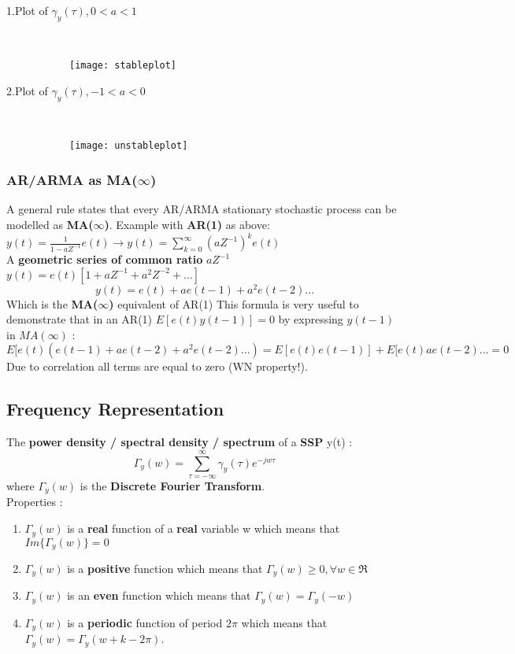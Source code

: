 \newpage
\begin{description}
\item[1.Plot of $\gamma_y(\tau) , 0<a<1$]\hfill\\
\begin{figure}[H]
 \centering
  \texttt{[image: stableplot]}
\end{figure}
\item[2.Plot of $\gamma_y(\tau) , -1<a<0$]\hfill\\
\begin{figure}[H]
 \centering
  \texttt{[image: unstableplot]}
\end{figure}
\end{description}
\subsubsection{AR/ARMA as MA($\infty$)}
A general rule states that every AR/ARMA stationary stochastic process can be modelled as 	\textbf{MA($\infty$)}. Example with \textbf{AR(1)} as above: \\
$ y(t) = \frac{1}{1-aZ^{-1}}e(t) \to y(t) = \sum\limits_{k=0}^{\infty}(aZ^{-1})^k e(t)$ \\A \textbf{geometric series of common ratio} $aZ^{-1}$ \\ 
$ y(t) = e(t)[1+aZ^{-1}+a^2Z^{-2}+...]$
\[
\boxed{y(t) = e(t)+ae(t-1)+a^2e(t-2)...}
\] 
Which is the \textbf{MA($\infty$)} equivalent of AR(1) 
This formula is very useful to demonstrate that in an AR(1) $E[e(t)y(t-1)] =0 $
by expressing $y(t-1)$ in $MA(\infty)$ :\\
$ E[e(t)(e(t-1)+ae(t-2)+a^2e(t-2)...)=E[e(t)e(t-1)]+E[e(t)ae(t-2)... = 0$\\
Due to correlation all terms are equal to zero (WN property!).
\newpage
\subsection{Frequency Representation}
The \textbf{power density / spectral density / spectrum } of a \textbf{SSP} y(t) :
\[
\boxed{\Gamma_y(w) = \sum\limits_{\tau = -\infty}^{\infty} \gamma_y(\tau)e^{-jw\tau}}
\]
where $\Gamma_y(w)$ is the \textbf{Discrete Fourier Transform}.\\
Properties :
\begin{enumerate}
\item $\Gamma_y(w)$ is a \textbf{real} function of a \textbf{real} variable w which means that $Im\{\Gamma_y(w)\}=0$
\item $\Gamma_y(w)$ is a \textbf{positive} function which means that $\Gamma_y(w) \geq 0 , \forall w \in \Re$
\item $\Gamma_y(w)$ is an \textbf{even} function which means that $\Gamma_y(w) =\Gamma_y(-w)$
\item $\Gamma_y(w)$ is a \textbf{periodic} function of period $2\pi$ which means that $\Gamma_y(w) = \Gamma_y(w+k-2\pi)$.
\end{enumerate}





